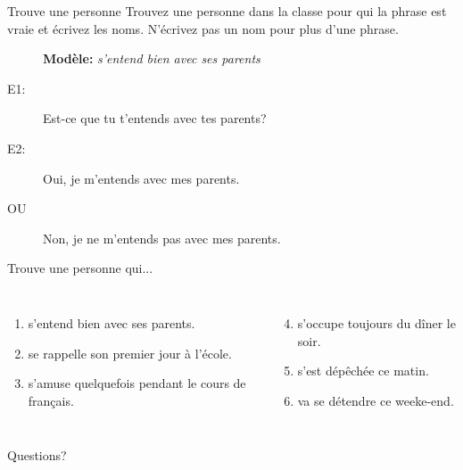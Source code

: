 \documentclass{beamer}
\begin{document}
  \begin{frame}{Trouve une personne}
    Trouvez une personne dans la classe pour qui la phrase est vraie et écrivez les noms.
    N'écrivez pas un nom pour plus d'une phrase.
    \begin{description}
      \item[] \textbf{Modèle:} \emph{s'entend bien avec ses parents}
      \item[E1:] Est-ce que \alert{tu t'entends} avec tes parents?
      \item[E2:] Oui, \alert{je m'entends} avec mes parents.
      \item[OU] Non, \alert{je ne m'entends pas} avec mes parents.
    \end{description}
    \vspace{0.25cm}
    Trouve une personne qui...
    \begin{columns}[t]
        \begin{enumerate}
          \item s'entend bien avec ses parents.
          \item se rappelle son premier jour à l'école.
          \item s'amuse quelquefois pendant le cours de français.
        \end{enumerate}
        \begin{enumerate}
          \setcounter{enumi}{3}
          \item s'occupe toujours du dîner le soir.
          \item s'est dépêchée ce matin.
          \item va se détendre ce weeke-end.
        \end{enumerate}
      \end{columns}
  \end{frame}

  \begin{frame}{}
    \begin{center}
      \Large Questions?
    \end{center}
  \end{frame}
\end{document}
